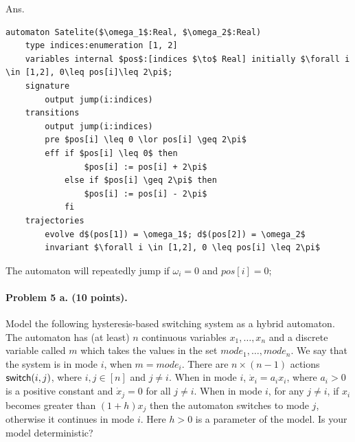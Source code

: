\documentclass[11pt]{article}
\begin{document}
Ans.

\begin{lstlisting}[language=ioaLang, mathescape=true]
automaton Satelite($\omega_1$:Real, $\omega_2$:Real)
    type indices:enumeration [1, 2]
    variables internal $pos$:[indices $\to$ Real] initially $\forall i \in [1,2], 0\leq pos[i]\leq 2\pi$;
    signature
        output jump(i:indices)
    transitions
        output jump(i:indices)
        pre $pos[i] \leq 0 \lor pos[i] \geq 2\pi$
        eff if $pos[i] \leq 0$ then
                $pos[i] := pos[i] + 2\pi$
            else if $pos[i] \geq 2\pi$ then
                $pos[i] := pos[i] - 2\pi$
            fi
    trajectories
        evolve d$(pos[1]) = \omega_1$; d$(pos[2]) = \omega_2$
        invariant $\forall i \in [1,2], 0 \leq pos[i] \leq 2\pi$
\end{lstlisting}

The automaton will repeatedly jump if $\omega_i = 0$ and $pos[i] = 0$;



\paragraph{Problem 5 a. (10 points).}
Model the following hysteresis-based switching system as a hybrid automaton.
The automaton has (at least) $n$ continuous variables $x_1,\ldots,x_n$ and a discrete variable called $\mathit{m}$ which takes the values in the set
$\mathit{mode_1},\ldots,\mathit{mode}_n$.
We say that the system is in mode $i$, when $m = \mathit{mode}_i$.
There are $n \times (n-1)$ actions ${\operatorname{\mathsf{switch}}}(i,j)$,  where $i,j \in [n]$ and $j \neq i$.
%
When in mode $i$, $\dot{x}_i = a_i x_i$, where $a_i >0$ is a positive constant and $\dot{x}_j = 0$ for all $j \neq i$.
When in mode $i$, for any $j \neq i$, if $x_i$ becomes greater than $(1+h) x_j$ then the automaton switches to mode $j$, otherwise it continues in mode $i$.
Here $h > 0$ is a parameter of the model. Is your model deterministic?
\end{document}
